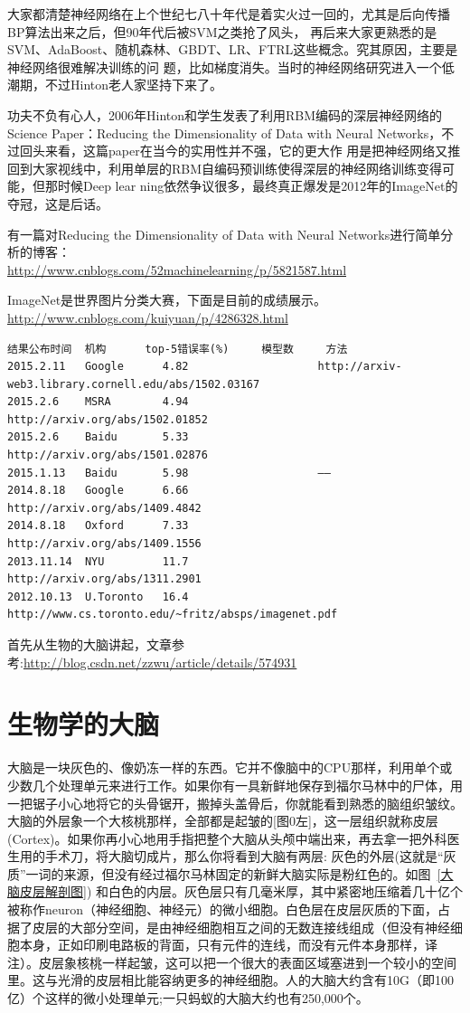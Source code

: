 大家都清楚神经网络在上个世纪七八十年代是着实火过一回的，尤其是后向传播BP算法出来之后，但90年代后被SVM之类抢了风头，
再后来大家更熟悉的是SVM、AdaBoost、随机森林、GBDT、LR、FTRL这些概念。究其原因，主要是神经网络很难解决训练的问
题，比如梯度消失。当时的神经网络研究进入一个低潮期，不过Hinton老人家坚持下来了。

功夫不负有心人，2006年Hinton和学生发表了利用RBM编码的深层神经网络的Science Paper：Reducing the 
Dimensionality of Data with Neural Networks，不过回头来看，这篇paper在当今的实用性并不强，它的更大作
用是把神经网络又推回到大家视线中，利用单层的RBM自编码预训练使得深层的神经网络训练变得可能，但那时候Deep lear
ning依然争议很多，最终真正爆发是2012年的ImageNet的夺冠，这是后话。

有一篇对Reducing the Dimensionality of Data with Neural Networks进行简单分析的博客：\\
\url{http://www.cnblogs.com/52machinelearning/p/5821587.html}

ImageNet是世界图片分类大赛，下面是目前的成绩展示。\url{http://www.cnblogs.com/kuiyuan/p/4286328.html}
\begin{verbatim}
结果公布时间 	机构		top-5错误率(%) 	模型数 	方法
2015.2.11 	Google 		4.82 	  				http://arxiv-web3.library.cornell.edu/abs/1502.03167
2015.2.6 	MSRA 		4.94 	  				http://arxiv.org/abs/1502.01852
2015.2.6 	Baidu 		5.33 	  				http://arxiv.org/abs/1501.02876
2015.1.13 	Baidu 		5.98 	  				——
2014.8.18 	Google 		6.66 	  				http://arxiv.org/abs/1409.4842
2014.8.18 	Oxford 		7.33 	 			 	http://arxiv.org/abs/1409.1556
2013.11.14 	NYU 		11.7 	  				http://arxiv.org/abs/1311.2901
2012.10.13 	U.Toronto 	16.4 	  				http://www.cs.toronto.edu/~fritz/absps/imagenet.pdf
\end{verbatim}


首先从生物的大脑讲起，文章参考:\url{http://blog.csdn.net/zzwu/article/details/574931}
\section{生物学的大脑}
大脑是一块灰色的、像奶冻一样的东西。它并不像脑中的CPU那样，利用单个或少数几个处理单元来进行工作。如果你有一具新鲜地保存到福尔马林中的尸体，用一把锯子小心地将它的头骨锯开，搬掉头盖骨后，你就能看到熟悉的脑组织皱纹。大脑的外层象一个大核桃那样，全部都是起皱的[图0左]，这一层组织就称皮层(Cortex)。如果你再小心地用手指把整个大脑从头颅中端出来，再去拿一把外科医生用的手术刀，将大脑切成片，那么你将看到大脑有两层: 灰色的外层(这就是“灰质”一词的来源，但没有经过福尔马林固定的新鲜大脑实际是粉红色的。如图~\ref{大脑皮层解剖图}) 和白色的内层。灰色层只有几毫米厚，其中紧密地压缩着几十亿个被称作neuron（神经细胞、神经元）的微小细胞。白色层在皮层灰质的下面，占据了皮层的大部分空间，是由神经细胞相互之间的无数连接线组成（但没有神经细胞本身，正如印刷电路板的背面，只有元件的连线，而没有元件本身那样，译注）。皮层象核桃一样起皱，这可以把一个很大的表面区域塞进到一个较小的空间里。这与光滑的皮层相比能容纳更多的神经细胞。人的大脑大约含有10G（即100亿）个这样的微小处理单元;一只蚂蚁的大脑大约也有250,000个。


